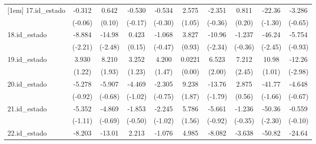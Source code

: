 {\begin{tabular}{l*{9}{c}}
[1em]
17.id\_estado&      -0.312         &       0.642         &      -0.530         &      -0.534         &       2.575         &      -2.351         &       0.811         &      -22.36         &      -3.286         \\
            &     (-0.06)         &      (0.10)         &     (-0.17)         &     (-0.30)         &      (1.05)         &     (-0.36)         &      (0.20)         &     (-1.30)         &     (-0.65)         \\
[1em]
18.id\_estado&      -8.884\sym{*}  &      -14.98\sym{*}  &       0.423         &      -1.068         &       3.827         &      -10.96\sym{*}  &      -1.237         &      -46.24\sym{*}  &      -5.754         \\
            &     (-2.21)         &     (-2.48)         &      (0.15)         &     (-0.47)         &      (0.93)         &     (-2.34)         &     (-0.36)         &     (-2.45)         &     (-0.93)         \\
[1em]
19.id\_estado&       3.930         &       8.210         &       3.252         &       4.200         &      0.0221         &       6.523\sym{*}  &       7.212\sym{*}  &       10.98         &      -12.26\sym{**} \\
            &      (1.22)         &      (1.93)         &      (1.23)         &      (1.47)         &      (0.00)         &      (2.00)         &      (2.45)         &      (1.01)         &     (-2.98)         \\
[1em]
20.id\_estado&      -5.278         &      -5.907         &      -4.469         &      -2.305         &       9.238         &      -13.76         &       2.875         &      -41.77         &      -4.648         \\
            &     (-0.92)         &     (-0.68)         &     (-1.02)         &     (-0.75)         &      (1.87)         &     (-1.79)         &      (0.56)         &     (-1.66)         &     (-0.67)         \\
[1em]
21.id\_estado&      -5.352         &      -4.869         &      -1.853         &      -2.245         &       5.786         &      -5.661         &      -1.236         &      -50.36\sym{*}  &      -0.559         \\
            &     (-1.11)         &     (-0.69)         &     (-0.50)         &     (-1.02)         &      (1.56)         &     (-0.92)         &     (-0.35)         &     (-2.30)         &     (-0.10)         \\
[1em]
22.id\_estado&      -8.203         &      -13.01\sym{*}  &       2.213         &      -1.076         &       4.985         &      -8.082         &      -3.638         &      -50.82\sym{*}  &      -24.64\sym{***}\\

\end{tabular}}

